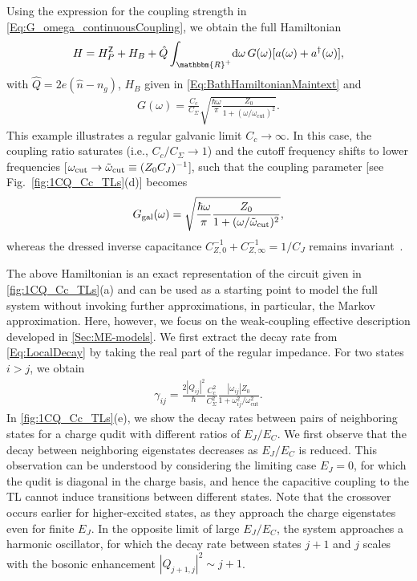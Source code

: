 \documentclass[prx,aps,twocolumn,article]{revtex4-2}
\newcommand{\msf}[1]{\mathsf{#1}}
\newcommand{\msZ}{\msf{Z}}
\newcommand{\wcut}{\omega_{\text{cut}}}
\begin{document}
Using the expression for the coupling strength in \cref{Eq:G_omega_continuousCoupling}, we obtain the full Hamiltonian
\begin{align}
    H=H_P^\msZ+H_B +\hat Q \int_{\mathbbm{R}^+}\!\mathrm d\omega\,
     G(\omega)[a(\omega)+a^\dag(\omega)],\label{eq:H_1CQ_Cc_Semi-Inf}
\end{align}
with $\hat Q=2e(\hat n-n_g)$, $H_B$ given in \cref{Eq:BathHamiltonianMaintext} and 
\begin{align}
    G(\omega)=\frac{C_c}{C_\Sigma}\sqrt{\frac{\hbar\omega}{\pi}\frac{Z_0 }{1+(\omega/\wcut)^2}}.
\end{align}
This example illustrates a regular galvanic limit $C_c\rightarrow\infty$. In this case, the coupling ratio saturates (i.e., $C_c/C_\Sigma\rightarrow1$) and the cutoff frequency shifts to lower frequencies
[$\wcut\rightarrow\tilde{\omega}_{\rm cut}\equiv(Z_0C_J)^{-1}$], such that the coupling parameter [see Fig.~\ref{fig:1CQ_Cc_TLs}(d)] becomes 
\begin{align}
 G_{\rm gal}(\omega)=\sqrt{\frac{\hbar\omega}{\pi}\frac{Z_0}{1+(\omega/\tilde{\omega}_{\rm cut})^2}},
\end{align}
whereas the dressed inverse capacitance $C_{Z,0}^{-1}+C_{Z,\infty}^{-1}=1/C_J$ remains invariant~\cite{Mehta:2022}.


The above Hamiltonian is an exact representation of the circuit given in \cref{fig:1CQ_Cc_TLs}(a) and can be used as a starting point to model the full system without invoking further approximations, in particular, the Markov approximation. Here, however, we focus on the weak-coupling effective description developed in \cref{Sec:ME-models}. We first extract the decay rate from \cref{Eq:LocalDecay} by taking the real part of the regular impedance. For two states $i>j$, we obtain
\begin{align}
    \gamma_{ij}=\frac{2|Q_{ij}|^2}{\hbar}\frac{C_c^2}{C_\Sigma^2}\frac{|\omega_{ij}|Z_0}{1+\omega_{ij}^2/\wcut^2}.
\end{align}    
In \cref{fig:1CQ_Cc_TLs}(e), we show the decay rates between pairs of neighboring states for a charge qudit with different ratios of $E_J/E_C$. We first observe that the decay between neighboring eigenstates decreases as $E_J/E_C$ is reduced. This observation can be understood by considering the limiting case $E_J=0$, for which the qudit is diagonal in the charge basis, and hence the capacitive coupling to the \gls{TL} cannot induce transitions between different states. Note that the crossover occurs earlier for higher-excited states, as they approach the charge eigenstates even for finite $E_J$. In the opposite limit of large $E_J/E_C$, the system approaches a harmonic oscillator, for which the decay rate between states $j+1$ and $j$ scales with the bosonic enhancement $|Q_{j+1,j}|^2\sim j+1$.
\end{document}
